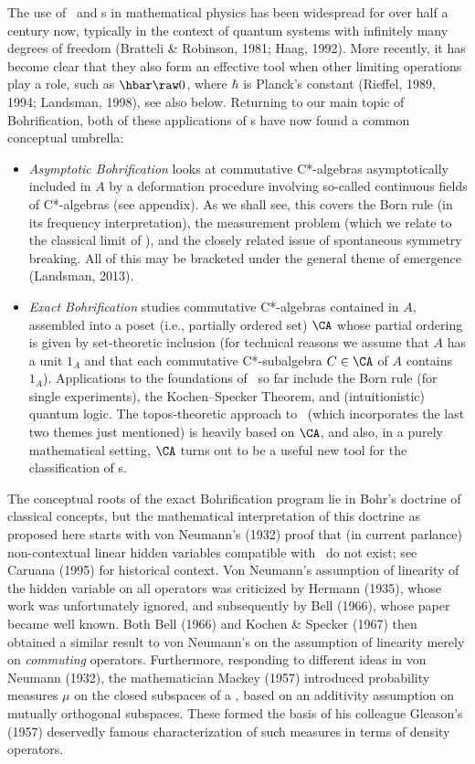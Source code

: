 \documentclass[12pt]{article}
\begin{document}
The use of \ca\ and \vna s in mathematical physics has been widespread for over half a century now,  typically in the context of quantum systems with infinitely many degrees of freedom (Bratteli \&  Robinson, 1981; Haag, 1992). More recently, it has become clear that they also form an effective tool when other limiting operations play a role, such as $\hbar\raw 0$, where $\hbar$ is Planck's constant (Rieffel, 1989, 1994; Landsman, 1998), see also below.  Returning to our main topic of Bohrification, both of these applications of \ca s have now found a common conceptual umbrella:  
 \begin{itemize}   
 \item  \emph{Asymptotic  Bohrification} looks at commutative C*-algebras asymptotically included in $A$ by a deformation procedure involving so-called continuous fields of C*-algebras (see appendix). As we shall see, this covers the Born rule (in its frequency interpretation), 
  the measurement problem (which we  relate to  the  classical limit of \qm), and the closely related issue of spontaneous symmetry breaking. All of this may be bracketed under the general theme of emergence
  (Landsman, 2013).
\item  \emph{Exact  Bohrification}  studies commutative C*-algebras contained in $A$, assembled into a poset (i.e., partially ordered set) $\CA$ whose partial ordering is given by set-theoretic inclusion (for technical reasons we assume that $A$ has a unit $1_A$ and that each commutative C*-subalgebra $C\in\CA$ of $A$ contains $1_A$). Applications to the foundations of \qm\ so far include the  Born rule (for single experiments), the Kochen--Specker Theorem, and (intuitionistic) quantum logic.  The topos-theoretic approach to \qm\ (which incorporates the last two themes just mentioned) is heavily based on $\CA$, and also, in a purely mathematical setting, $\CA$ turns out to be a useful new tool for the classification of \ca s.
\end{itemize}

 The conceptual roots of the exact Bohrification program  lie in Bohr's doctrine of classical concepts, but the mathematical interpretation of this doctrine as proposed here starts with
 von Neumann's (1932) proof that (in current parlance) non-contextual linear hidden variables compatible with  \qm\ do not exist;
 see Caruana (1995) for historical context.  Von Neumann's  assumption of linearity of the hidden variable on all operators was criticized by Hermann (1935), whose work was unfortunately ignored, and subsequently by  Bell (1966), whose paper  became well known.  Both Bell (1966) and Kochen \& Specker (1967) then obtained a similar result to von Neumann's on the assumption of linearity merely on \emph{commuting} operators. 
 Furthermore,  responding to different ideas in von Neumann (1932), the mathematician Mackey (1957) introduced probability measures $\mu$ on the closed subspaces of a \Hs, based on an additivity assumption on mutually orthogonal subspaces.
 These formed the basis of his colleague Gleason's (1957) deservedly famous characterization of such measures in terms of density operators.
 
\end{document}
